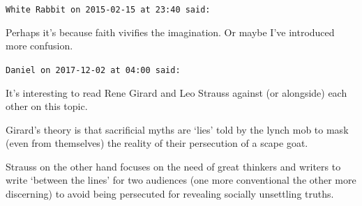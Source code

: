 \begin{footnotesize}
\begin{sffamily}
\hfill

\texttt{White Rabbit on 2015-02-15 at 23:40 said: }

Perhaps it's because faith vivifies the imagination. Or maybe I've introduced more confusion.


\hfill

\texttt{Daniel on 2017-12-02 at 04:00 said: }

It's interesting to read Rene Girard and Leo Strauss against (or alongside) each other on this topic. 

Girard's theory is that sacrificial myths are `lies' told by the lynch mob to mask (even from themselves) the reality of their persecution of a scape goat.

Strauss on the other hand focuses on the need of great thinkers and writers to write `between the lines' for two audiences (one more conventional the other more discerning) to avoid being persecuted for revealing socially unsettling truths.


\end{sffamily}\end{footnotesize}
